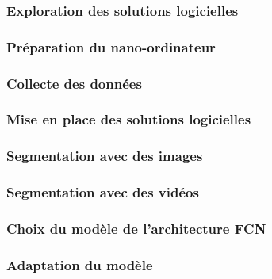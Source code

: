 \subsubsection{Exploration des solutions logicielles}

\subsubsection{Préparation du nano-ordinateur}

\subsubsection{Collecte des données}

\subsubsection{Mise en place des solutions logicielles}

\subsubsection{Segmentation avec des images}

\subsubsection{Segmentation avec des vidéos}

\subsubsection{Choix du modèle de l'architecture FCN}

\subsubsection{Adaptation du modèle}

